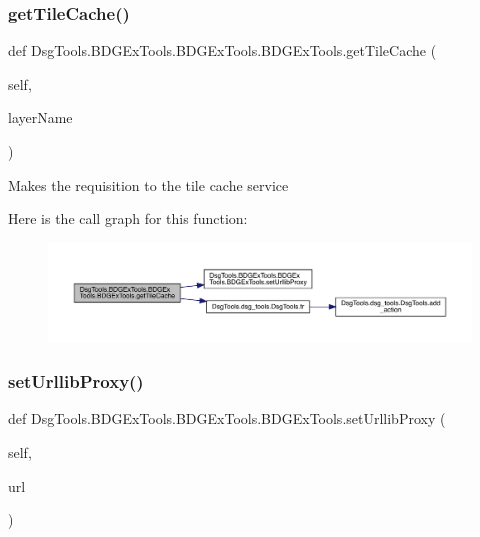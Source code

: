 \subsubsection{\texorpdfstring{get\+Tile\+Cache()}{getTileCache()}}
{\footnotesize\ttfamily def Dsg\+Tools.\+B\+D\+G\+Ex\+Tools.\+B\+D\+G\+Ex\+Tools.\+B\+D\+G\+Ex\+Tools.\+get\+Tile\+Cache (\begin{DoxyParamCaption}\item[{}]{self,  }\item[{}]{layer\+Name }\end{DoxyParamCaption})}

\begin{DoxyVerb}Makes the requisition to the tile cache service
\end{DoxyVerb}
 Here is the call graph for this function\+:
\nopagebreak
\begin{figure}[H]
\begin{center}
\leavevmode
\includegraphics[width=350pt]{class_dsg_tools_1_1_b_d_g_ex_tools_1_1_b_d_g_ex_tools_1_1_b_d_g_ex_tools_ab459fa07b2e293f9a1bc21dcceb6c6ff_cgraph}
\end{center}
\end{figure}
\mbox{\label{class_dsg_tools_1_1_b_d_g_ex_tools_1_1_b_d_g_ex_tools_1_1_b_d_g_ex_tools_a4aa1b6400c85244c9e1e58f2db6dd5b0}} 
\subsubsection{\texorpdfstring{set\+Urllib\+Proxy()}{setUrllibProxy()}}
{\footnotesize\ttfamily def Dsg\+Tools.\+B\+D\+G\+Ex\+Tools.\+B\+D\+G\+Ex\+Tools.\+B\+D\+G\+Ex\+Tools.\+set\+Urllib\+Proxy (\begin{DoxyParamCaption}\item[{}]{self,  }\item[{}]{url }\end{DoxyParamCaption})}

